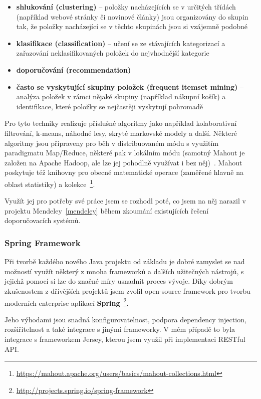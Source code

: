 \documentclass[thesis=M,czech]{FITthesis}[2014/05/07]
\begin{document}
\begin{itemize}
	\item \textbf{shlukování (clustering)} – položky nacházejících se v určitých třídách (například webové stránky či novinové články) jsou organizovány do skupin tak, že položky nacházející se v těchto skupinách jsou si vzájemně podobné
	\item \textbf{klasifikace (classification)} – učení se ze stávajících kategorizací a zařazování neklasifikovaných položek do nejvhodnější kategorie
	\item \textbf{doporučování (recommendation)}
	\item \textbf{často se vyskytující skupiny položek (frequent itemset mining)} – analýza položek v rámci nějaké skupiny (například nákupní košík) a identifikace, které položky se nejčastěji vyskytují pohromadě
\end{itemize}

Pro tyto techniky realizuje příslušné algoritmy jako například kolaborativní filtrování, k-means, náhodné lesy, skryté markovské modely a další. Některé algoritmy jsou připraveny pro běh v distribuovaném módu s využitím paradigmatu Map/Reduce, některé pak v lokálním módu (samotný Mahout je založen na Apache Hadoop, ale lze jej pohodlně využívat i bez něj)~\cite{mahouttut}. Mahout poskytuje též knihovny pro obecné matematické operace (zaměřené hlavně na oblast statistiky) a kolekce~\footnote{\url{https://mahout.apache.org/users/basics/mahout-collections.html}}. 

Využít jej pro potřeby své práce jsem se rozhodl poté, co jsem na něj narazil v projektu Mendeley~\ref{mendeley} během zkoumání existujících řešení doporučovacích systémů. 

\subsubsection{Spring Framework}
Při tvorbě každého nového Java projektu od základu je dobré zamyslet se nad možností využít některý z mnoha frameworků a dalších užitečných nástrojů, s jejichž pomocí si lze do značné míry usnadnit proces vývoje. Díky dobrým zkušenostem z dřívějších projektů jsem zvolil open-source framework pro tvorbu moderních enterprise aplikací \textbf{Spring}~\footnote{\url{http://projects.spring.io/spring-framework}}. 

Jeho výhodami jsou snadná konfigurovatelnost, podpora dependency injection, rozšiřitelnost a také integrace s jinými frameworky. V mém případě to byla integrace s frameworkem Jersey, kterou jsem využil při implementaci RESTful API.
\end{document}
